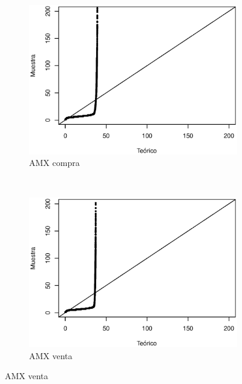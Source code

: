 \documentclass[11pt]{article}
\numberwithin{equation}{section} %
\begin{document}
\clearpage

\begin{figure}[htbp]
\centering
\begin{subfigure}[b]{0.5\textwidth}
\centering
\includegraphics[width=\textwidth, trim=0 0.5cm 0 1cm]{amxcanccompraqq.eps}
\caption{AMX compra}
\label{fig:amxvcanccompraqq}
\end{subfigure}%
~ %
\begin{subfigure}[b]{0.5\textwidth}
\centering
\includegraphics[width=\textwidth, trim=0 0.5cm 0 1cm]{amxcancventaqq.eps}
\caption{AMX venta}
\label{fig:amxcancventaqq}
\end{subfigure}


\end{figure}
\end{document}
